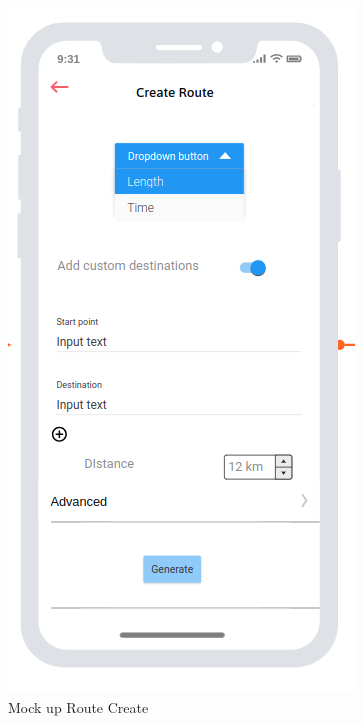     \begin{figure}[h!]
        \includegraphics[width=\linewidth]{./graphics/createRoute_Mockup.png}
        \caption{Mock up Route Create}
        \label{fig:createRouteMockup}
    \end{figure}

